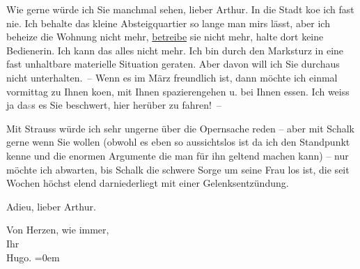 \pstart
           Wie gerne würde ich Sie manchmal sehen, lieber Arthur. In die Stadt ko{\geminationm}e ich fast nie. Ich behalte das kleine Absteigquartier
               so lange man mirs lässt, aber ich beheize die Wohnung nicht mehr, \uline{betreibe} sie nicht mehr, halte dort keine Bedienerin. Ich
               kann das alles nicht mehr. Ich bin durch den Marksturz in eine fast unhaltbare
               materielle Situation geraten. Aber davon will {\pb}ich Sie durchaus nicht
               unterhalten. – Wenn es im März freundlich ist, dann möchte ich einmal
               vormittag zu Ihnen ko{\geminationm}en, mit Ihnen spazierengehen u.
               bei Ihnen essen. Ich weiss ja da\textcolor{gray}{s}s es Sie beschwert, hier herüber
               zu fahren! –\pend
           
\pstart
           Mit Strauss würde ich sehr ungerne über die
                  Opernsache reden – aber mit
                  Schalk gerne wenn Sie wollen (obwohl es
               eben so aussichtslos ist da ich den Standpunkt kenne und die enormen Argumente die
               man für ihn geltend machen kann) – nur möchte ich abwarten, bis Schalk die schwere Sorge um seine Frau los ist, die seit Wochen höchst elend
               darniederliegt mit einer Gelenksentzündung.\pend
           
\pstart
           Adieu, lieber Arthur.\pend
           
\pstart
           Von Herzen, wie immer,{\\[\baselineskip]}Ihr{\\[\baselineskip]}\spacefill\mbox{Hugo.}\pend
           \leftskip=0em{}\endnumbering{}  
      
